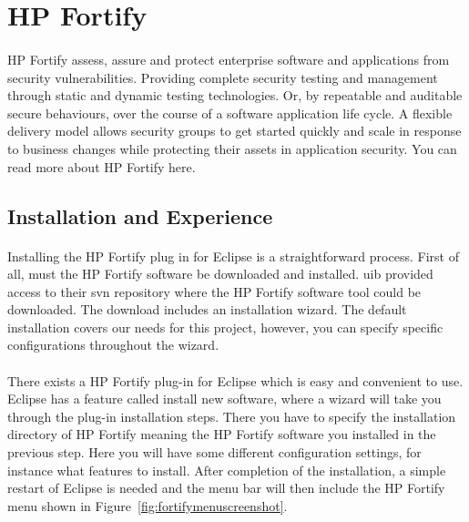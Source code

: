 \documentclass[11pt,english,a4paper]{report}
\begin{document}
\newpage

\section{HP Fortify}
\label{sectionfortifytool}
\paragraph{}
HP Fortify assess, assure and protect enterprise software and applications from security vulnerabilities.
Providing complete security testing and management through static and dynamic testing technologies. 
Or, by repeatable and auditable secure behaviours, over the course of a software application life cycle. 
A flexible delivery model allows security groups to get started quickly and scale in response to business changes while protecting their assets in application security. 
You can read more about HP Fortify here. \cite{fortify-software-wiki, fortify-software-homepage-features} 

\subsection{Installation and Experience}
\paragraph{}
Installing the HP Fortify plug in for Eclipse is a straightforward process. 
First of all, must the HP Fortify software be downloaded and installed.
\gls{uib} provided access to their \gls{svn} repository where the HP Fortify software tool could be downloaded.  
The download includes an installation wizard. 
The default installation covers our needs for this project, however, you can specify specific configurations throughout the wizard. \cite{installation-usage-guide}

\paragraph{}
There exists a HP Fortify plug-in for Eclipse which is easy and convenient to use.
Eclipse has a feature called install new software, where a wizard will take you through the plug-in installation steps.
There you have to specify the installation directory of HP Fortify meaning the HP Fortify software you installed in the previous step.
Here you will have some different configuration settings, for instance what features to install.
After completion of the installation, a simple restart of Eclipse is needed and the menu bar will then include the HP Fortify menu shown in Figure~\ref{fig:fortifymenuscreenshot}. \cite{installation-usage-guide}
\end{document}
